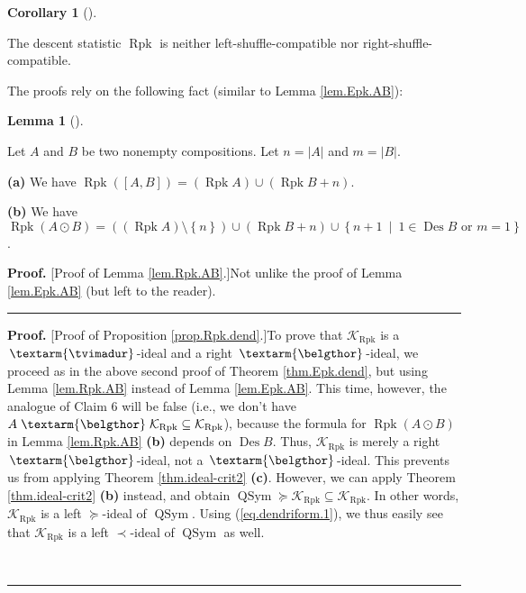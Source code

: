\documentclass[numbers=enddot,12pt,final,onecolumn,notitlepage]{scrartcl}%
\theoremstyle{definition}
\newtheorem{lem}[theo]{Lemma}
\newenvironment{lemma}[1][]
{\begin{lem}[#1]\begin{leftbar}}
{\end{leftbar}\end{lem}}
\newtheorem{coro}[theo]{Corollary}
\newenvironment{corollary}[1][]
{\begin{coro}[#1]\begin{leftbar}}
{\end{leftbar}\end{coro}}
\newenvironment{proof}[1][Proof]{\noindent\textbf{#1.} }{\ \rule{0.5em}{0.5em}}
\newenvironment{verlong}{}{}
\newcommand{\tvi}{\left. \textarm{\tvimadur} \right.}
\newcommand{\bel}{\left. \textarm{\belgthor} \right.}
\begin{document}
\begin{verlong}
\begin{corollary}
\label{cor.dendri.Rpk}The descent statistic $\operatorname*{Rpk}$ is neither
left-shuffle-compatible nor right-shuffle-compatible.
\end{corollary}

The proofs rely on the following fact (similar to Lemma \ref{lem.Epk.AB}):

\begin{lemma}
\label{lem.Rpk.AB}Let $A$ and $B$ be two nonempty compositions. Let
$n=\left\vert A\right\vert $ and $m=\left\vert B\right\vert $.

\textbf{(a)} We have $\operatorname*{Rpk}\left(  \left[  A,B\right]  \right)
=\left(  \operatorname*{Rpk}A\right)  \cup\left(  \operatorname*{Rpk}%
B+n\right)  $.

\textbf{(b)} We have $\operatorname*{Rpk}\left(  A\odot B\right)  =\left(
\left(  \operatorname*{Rpk}A\right)  \setminus\left\{  n\right\}  \right)
\cup\left(  \operatorname*{Rpk}B+n\right)  \cup\left\{  n+1\ \mid
\ 1\in\operatorname*{Des}B\text{ or }m=1\right\}  $.
\end{lemma}

\begin{proof}
[Proof of Lemma \ref{lem.Rpk.AB}.]Not unlike the proof of Lemma
\ref{lem.Epk.AB} (but left to the reader).
\end{proof}

\begin{proof}
[Proof of Proposition \ref{prop.Rpk.dend}.]To prove that $\mathcal{K}%
_{\operatorname*{Rpk}}$ is a $\tvi$-ideal and a right $\bel$-ideal, we proceed
as in the above second proof of Theorem \ref{thm.Epk.dend}, but using Lemma
\ref{lem.Rpk.AB} instead of Lemma \ref{lem.Epk.AB}. This time, however, the
analogue of Claim 6 will be false (i.e., we don't have $A\bel\mathcal{K}%
_{\operatorname*{Rpk}}\subseteq\mathcal{K}_{\operatorname*{Rpk}}$), because
the formula for $\operatorname*{Rpk}\left(  A\odot B\right)  $ in Lemma
\ref{lem.Rpk.AB} \textbf{(b)} depends on $\operatorname*{Des}B$. Thus,
$\mathcal{K}_{\operatorname*{Rpk}}$ is merely a right $\bel$-ideal, not a
$\bel$-ideal. This prevents us from applying Theorem \ref{thm.ideal-crit2}
\textbf{(c)}. However, we can apply Theorem \ref{thm.ideal-crit2} \textbf{(b)}
instead, and obtain $\operatorname*{QSym}\left.  \succeq\right.
\mathcal{K}_{\operatorname*{Rpk}}\subseteq\mathcal{K}_{\operatorname*{Rpk}}$.
In other words, $\mathcal{K}_{\operatorname*{Rpk}}$ is a left $\left.
\succeq\right.  $-ideal of $\operatorname*{QSym}$. Using
(\ref{eq.dendriform.1}), we thus easily see that $\mathcal{K}%
_{\operatorname*{Rpk}}$ is a left $\left.  \prec\right.  $-ideal of
$\operatorname*{QSym}$ as well.


\end{proof}
\end{verlong}
\end{document}
